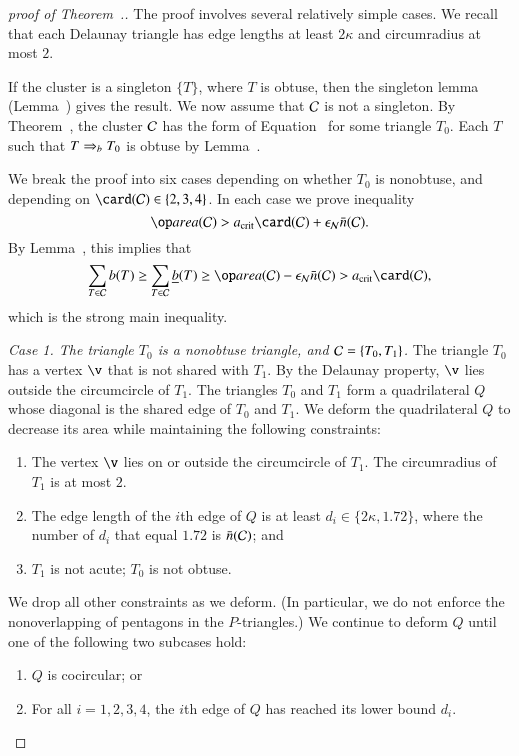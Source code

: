 \begin{proof}[proof of Theorem~.]
  The proof involves several relatively simple cases.  
  We recall that each Delaunay triangle has edge lengths at
  least $2\kappa$ and circumradius at most $2$.

  If the cluster is a singleton $\{T\}$, where $T$ is obtuse, then the
  singleton lemma (Lemma~) gives the result.  We
  now assume that $\mathcal C$ is not a singleton.  By
  Theorem~, the cluster $\mathcal C$ has the form of
  Equation~ for some triangle $T_0$.  Each $T$ such
  that $T\Rightarrow_{b} T_0$ is obtuse by Lemma~.

  We break the proof into six cases depending on whether $T_0$ is
  nonobtuse, and depending on $\card(\C)\in \{2,3,4\}$.  In each case
  we prove inequality
\begin{equation}\libel{eqn:n}
 \area(\C) > \acrit \card(\C) + \epsN \tn(\C).
\end{equation}
By Lemma~,    this implies that
\[
\sum_{T\in\C} b(T) \ge \sum_{T\in\C} \tb(T) 
\ge \area(\C) -  \epsN\tn(\C) 
> \acrit \card(\C),
\]
which is the strong main inequality.

{\it Case 1. The triangle $T_0$ is a nonobtuse triangle, and
  $\mathcal C=\{T_0,T_1\}$.}  The triangle $T_0$ has a vertex $\v$ that is
not shared with $T_1$.  By the Delaunay property, $\v$ lies outside
the circumcircle of $T_1$.  The triangles $T_0$ and $T_1$ form a
quadrilateral $Q$ whose diagonal is the shared edge of $T_0$ and
$T_1$.  We deform the quadrilateral $Q$ to decrease its area while
maintaining the following constraints:
\begin{enumerate}
\item The vertex $\v$ lies on or outside the circumcircle of
  $T_1$. The circumradius of $T_1$ is at most $2$.
\item The edge length of the $i$th edge of $Q$ is at least
  $d_i\in\{2\kappa,1.72\}$,
where  the number of $d_i$ that equal $1.72$ is $\bar n(\mathcal C)$; and
\item $T_1$ is not acute; $T_0$ is not obtuse.
\end{enumerate}
We drop all other constraints as we deform. (In particular, we do not
enforce the nonoverlapping of pentagons in the $P$-triangles.)  We
continue to deform $Q$ until one of the following two subcases hold:
\begin{enumerate}
\item $Q$ is cocircular; or
\item For all $i=1,2,3,4$, the $i$th edge of $Q$ has reached its lower
  bound $d_i$.
\end{enumerate}


\end{proof}
